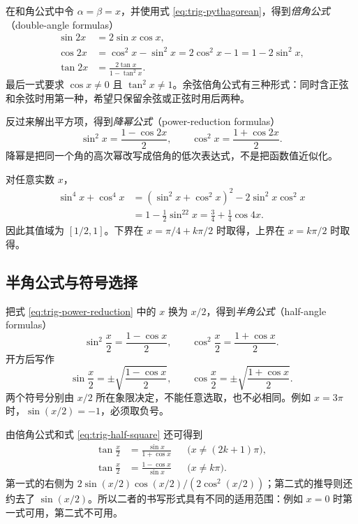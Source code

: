 \documentclass[UTF8,12pt,a4paper,fontset=fandol]{ctexart}
\begin{document}
在和角公式中令 $\alpha=\beta=x$，并使用式 \eqref{eq:trig-pythagorean}，得到\emph{倍角公式}（double-angle formulas）
\begin{align}
  \sin2x&=2\sin x\cos x,\label{eq:trig-double-sin}\\
  \cos2x&=\cos^2x-\sin^2x
  =2\cos^2x-1=1-2\sin^2x,\label{eq:trig-double-cos}\\
  \tan2x&=\frac{2\tan x}{1-\tan^2x}.\label{eq:trig-double-tan}
\end{align}
最后一式要求 $\cos x\ne0$ 且 $\tan^2x\ne1$。余弦倍角公式有三种形式：同时含正弦和余弦时用第一种，希望只保留余弦或正弦时用后两种。

反过来解出平方项，得到\emph{降幂公式}（power-reduction formulas）
\begin{equation}\label{eq:trig-power-reduction}
  \boxed{\sin^2x=\frac{1-\cos2x}{2},\qquad
  \cos^2x=\frac{1+\cos2x}{2}}.
\end{equation}
降幂是把同一个角的高次幂改写成倍角的低次表达式，不是把函数值近似化。

\begin{example}[四次幂的化简与范围]
对任意实数 $x$，
\begin{align*}
  \sin^4x+\cos^4x
  &=(\sin^2x+\cos^2x)^2-2\sin^2x\cos^2x\\
  &=1-\frac12\sin^22x=\frac34+\frac14\cos4x.
\end{align*}
因此其值域为 $[1/2,1]$。下界在 $x=\pi/4+k\pi/2$ 时取得，上界在 $x=k\pi/2$ 时取得。
\end{example}

\subsection{半角公式与符号选择}

把式 \eqref{eq:trig-power-reduction} 中的 $x$ 换为 $x/2$，得到\emph{半角公式}（half-angle formulas）
\begin{equation}\label{eq:trig-half-square}
  \sin^2\frac x2=\frac{1-\cos x}{2},\qquad
  \cos^2\frac x2=\frac{1+\cos x}{2}.
\end{equation}
开方后写作
\begin{equation}\label{eq:trig-half-root}
  \sin\frac x2=\pm\sqrt{\frac{1-\cos x}{2}},\qquad
  \cos\frac x2=\pm\sqrt{\frac{1+\cos x}{2}}.
\end{equation}
两个符号分别由 $x/2$ 所在象限决定，不能任意选取，也不必相同。例如 $x=3\pi$ 时，$\sin(x/2)=-1$，必须取负号。

由倍角公式和式 \eqref{eq:trig-half-square} 还可得到
\begin{align}
  \tan\frac x2&=\frac{\sin x}{1+\cos x}
  &&\bigl(x\ne(2k+1)\pi\bigr),\label{eq:trig-half-tan-a}\\
  \tan\frac x2&=\frac{1-\cos x}{\sin x}
  &&\bigl(x\ne k\pi\bigr).\label{eq:trig-half-tan-b}
\end{align}
第一式的右侧为 $2\sin(x/2)\cos(x/2)/(2\cos^2(x/2))$；第二式的推导则还约去了 $\sin(x/2)$。所以二者的书写形式具有不同的适用范围：例如 $x=0$ 时第一式可用，第二式不可用。
\end{document}
